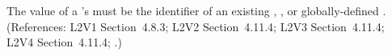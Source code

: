 The value of a \RateRule's  must be the identifier
of an existing \Compartment, \Species, or globally-defined \Parameter.
(References: L2V1 Section~4.8.3; L2V2 Section~4.11.4; L2V3
Section~4.11.4; L2V4 Section~4.11.4; .)
